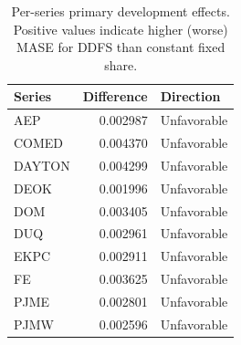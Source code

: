 \begin{table}[H]
\centering
\small
\caption{Per-series primary development effects. Positive values indicate higher (worse) MASE for \textsc{DDFS} than constant fixed share.}
\label{tab:series-effects}
\begin{tabular}{l r l}
\toprule
Series & Difference & Direction \\
\midrule
AEP & 0.002987 & Unfavorable \\
COMED & 0.004370 & Unfavorable \\
DAYTON & 0.004299 & Unfavorable \\
DEOK & 0.001996 & Unfavorable \\
DOM & 0.003405 & Unfavorable \\
DUQ & 0.002961 & Unfavorable \\
EKPC & 0.002911 & Unfavorable \\
FE & 0.003625 & Unfavorable \\
PJME & 0.002801 & Unfavorable \\
PJMW & 0.002596 & Unfavorable \\
\bottomrule
\end{tabular}
\end{table}
